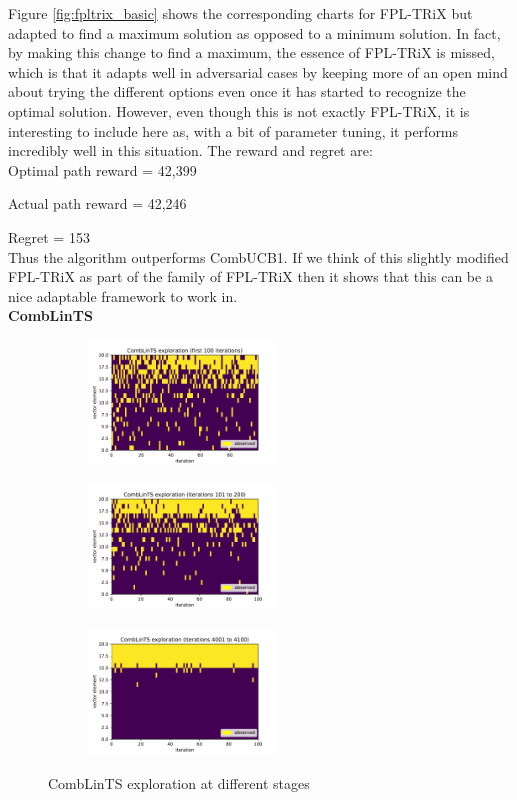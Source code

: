 Figure \ref{fig:fpltrix_basic} shows the corresponding charts for FPL-TRiX but adapted to find a maximum solution as opposed to a minimum solution. In fact, by making this change to find a maximum, the essence of FPL-TRiX is missed, which is that it adapts well in adversarial cases by keeping more of an open mind about trying the different options even once it has started to recognize the optimal solution. However, even though this is not exactly FPL-TRiX, it is interesting to include here as, with a bit of parameter tuning, it performs incredibly well in this situation. The reward and regret are:\\

Optimal path reward = 42,399

Actual path reward = 42,246

Regret = 153\\

Thus the algorithm outperforms CombUCB1. If we think of this slightly modified FPL-TRiX as part of the family of FPL-TRiX then it shows that this can be a nice adaptable framework to work in.\\

\noindent \textbf{CombLinTS}\\



\begin{figure}[ht!]
\centering
\begin{subfigure}{.33\textwidth}
  \centering
  \includegraphics[width=50mm]{../plots/basicCombLinTS_100iters.pdf}
  \caption{}
\end{subfigure}%
\begin{subfigure}{.33\textwidth}
  \centering
  \includegraphics[width=50mm]{../plots/basicCombLinTS_100_200iters.pdf}
  \caption{}
\end{subfigure}
\begin{subfigure}{.33\textwidth}
  \centering
  \includegraphics[width=50mm]{../plots/basicCombLinTS_4000_4100iters.pdf}
  \caption{}
\end{subfigure}
\caption{CombLinTS exploration at different stages}
\label{fig:comblints_basic}
\end{figure}


